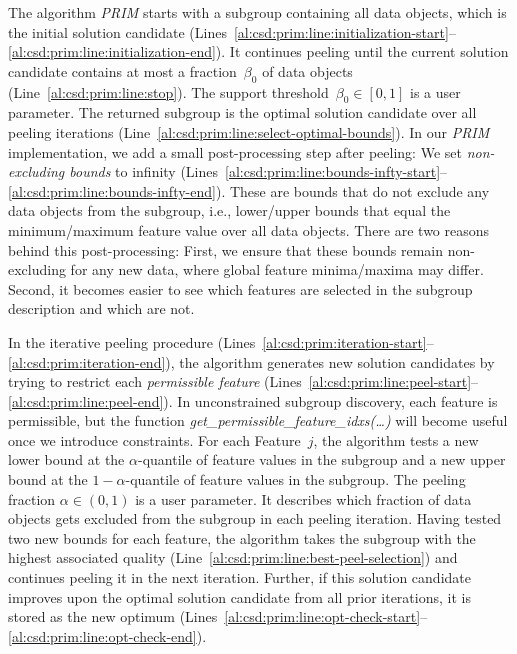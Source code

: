 \documentclass{article}
\theoremstyle{definition}
\begin{document}
The algorithm \emph{PRIM} starts with a subgroup containing all data objects, which is the initial solution candidate (Lines~\ref{al:csd:prim:line:initialization-start}--\ref{al:csd:prim:line:initialization-end}).
It continues peeling until the current solution candidate contains at most a fraction~$\beta_0$ of data objects (Line~\ref{al:csd:prim:line:stop}).
The support threshold~$\beta_0 \in [0, 1]$ is a user parameter.
The returned subgroup is the optimal solution candidate over all peeling iterations (Line~\ref{al:csd:prim:line:select-optimal-bounds}).
In our \emph{PRIM} implementation, we add a small post-processing step after peeling:
We set \emph{non-excluding bounds} to infinity (Lines~\ref{al:csd:prim:line:bounds-infty-start}--\ref{al:csd:prim:line:bounds-infty-end}).
These are bounds that do not exclude any data objects from the subgroup, i.e., lower/upper bounds that equal the minimum/maximum feature value over all data objects.
There are two reasons behind this post-processing:
First, we ensure that these bounds remain non-excluding for any new data, where global feature minima/maxima may differ.
Second, it becomes easier to see which features are selected in the subgroup description and which are not.

In the iterative peeling procedure (Lines~\ref{al:csd:prim:iteration-start}--\ref{al:csd:prim:iteration-end}), the algorithm generates new solution candidates by trying to restrict each \emph{permissible feature} (Lines~\ref{al:csd:prim:line:peel-start}--\ref{al:csd:prim:line:peel-end}).
In unconstrained subgroup discovery, each feature is permissible, but the function \emph{get\_permissible\_feature\_idxs(\dots)} will become useful once we introduce constraints.
For each Feature~$j$, the algorithm tests a new lower bound at the $\alpha$-quantile of feature values in the subgroup and a new upper bound at the $1-\alpha$-quantile of feature values in the subgroup.
The peeling fraction $\alpha \in (0, 1)$ is a user parameter.
It describes which fraction of data objects gets excluded from the subgroup in each peeling iteration.
Having tested two new bounds for each feature, the algorithm takes the subgroup with the highest associated quality (Line~\ref{al:csd:prim:line:best-peel-selection}) and continues peeling it in the next iteration.
Further, if this solution candidate improves upon the optimal solution candidate from all prior iterations, it is stored as the new optimum (Lines~\ref{al:csd:prim:line:opt-check-start}--\ref{al:csd:prim:line:opt-check-end}).
\end{document}
